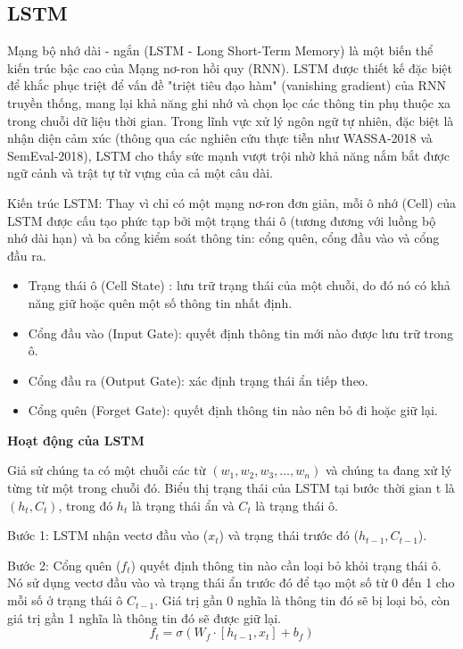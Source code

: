 \subsection{LSTM}

Mạng bộ nhớ dài - ngắn (LSTM - Long Short-Term Memory) là một biến thể kiến trúc bậc cao của Mạng nơ-ron hồi quy (RNN). LSTM được thiết kế đặc biệt để khắc phục triệt để vấn đề "triệt tiêu đạo hàm" (vanishing gradient) của RNN truyền thống, mang lại khả năng ghi nhớ và chọn lọc các thông tin phụ thuộc xa trong chuỗi dữ liệu thời gian. Trong lĩnh vực xử lý ngôn ngữ tự nhiên, đặc biệt là nhận diện cảm xúc (thông qua các nghiên cứu thực tiễn như WASSA-2018 và SemEval-2018), LSTM cho thấy sức mạnh vượt trội nhờ khả năng nắm bắt được ngữ cảnh và trật tự từ vựng của cả một câu dài.

Kiến trúc LSTM: Thay vì chỉ có một mạng nơ-ron đơn giản, mỗi ô nhớ (Cell) của LSTM được cấu tạo phức tạp bởi một trạng thái ô (tương đương với luồng bộ nhớ dài hạn) và ba cổng kiểm soát thông tin: cổng quên, cổng đầu vào và cổng đầu ra.
\begin{itemize}
	\item Trạng thái ô (Cell State) : lưu trữ trạng thái của một chuỗi, do đó nó có khả năng giữ hoặc quên một số thông tin nhất định.
	\item Cổng đầu vào (Input Gate): quyết định thông tin mới nào được lưu trữ trong ô.
	\item Cổng đầu ra (Output Gate): xác định trạng thái ẩn tiếp theo.
	\item Cổng quên (Forget Gate): quyết định thông tin nào nên bỏ đi hoặc giữ lại.
\end{itemize}

\textbf{Hoạt động của LSTM}

Giả sử chúng ta có một chuỗi các từ $(w_1, w_2, w_3, \dots, w_n)$ và chúng ta đang xử lý từng từ một trong chuỗi đó. Biểu thị trạng thái của LSTM tại bước thời gian t là $(h_t, C_t)$, trong đó $h_t$ là trạng thái ẩn và $C_t$ là trạng thái ô.

Bước 1: LSTM nhận vectơ đầu vào ($x_t$) và trạng thái trước đó ($h_{t-1}, C_{t-1}$).

Bước 2: Cổng quên ($f_t$) quyết định thông tin nào cần loại bỏ khỏi trạng thái ô. Nó sử dụng vectơ đầu vào và trạng thái ẩn trước đó để tạo một số từ 0 đến 1 cho mỗi số ở trạng thái ô $C_{t-1}$. Giá trị gần 0 nghĩa là thông tin đó sẽ bị loại bỏ, còn giá trị gần 1 nghĩa là thông tin đó sẽ được giữ lại.
\begin{equation}
	f_t = \sigma(W_f \cdot [h_{t-1}, x_t] + b_f)
\end{equation}

